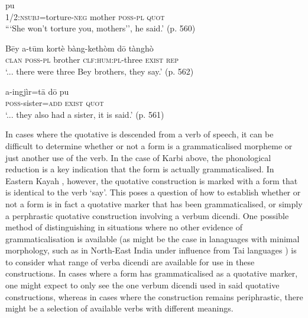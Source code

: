 \begin{exe}
        \ex 
        \begin{xlist}
                \ex\label{e:Description:KarbiQuot}
                \gll [nang=chenék-Cē pēi a-tūm] pu \\
                1/2:\textsc{nsubj}=torture-\textsc{neg} mother \textsc{poss-pl} \textsc{quot} \\
                \glt ```She won't torture you, mothers'', he said.' (p. 560)

                \ex\label{e:Description:KarbiReport}
                \gll Bēy a-tūm kortè bàng-kethòm dō tànghò \\
                \textsc{clan} \textsc{poss-pl} brother \textsc{clf:hum:pl}-three \textsc{exist} \textsc{rep} \\
                \glt `... there were three Bey brothers, they say.' (p. 562)

                \ex\label{e:Description:KarbiBoth}
                \gll a-ingjìr=tā dō pu \\
                \textsc{poss}-sister=\textsc{add} \textsc{exist} \textsc{quot} \\
                \glt `... they also had a sister, it is said.' (p. 561)
        \end{xlist}
        \cite[Karbi,][]{Konnerth2020}
\end{exe}

In cases where the quotative is descended from a verb of speech, it can be difficult to determine whether or not a form is a grammaticalised morpheme or just another use of the verb. In the case of Karbi above, the phonological reduction is a key indication that the form is actually grammaticalised. In Eastern Kayah \cite[Karenic: Myanmar,][]{Solnit1986}, however, the quotative construction is marked with a form that is identical to the verb `say'. This poses a question of how to establish whether or not a form is in fact a quotative marker that has been grammaticalised, or simply a perphrastic quotative construction involving a verbum dicendi. One possible method of distinguishing in situations where no other evidence of grammaticalisation is available (as might be the case in lanaguages with minimal morphology, such as in North-East India under influence from Tai languages \cite{Post2017}) is to consider what range of verba dicendi are available for use in these constructions. In cases where a form has grammaticalised as a quotative marker, one might expect to only see the one verbum dicendi used in said quotative constructions, whereas in cases where the construction remains periphrastic, there might be a selection of available verbs with different meanings.

